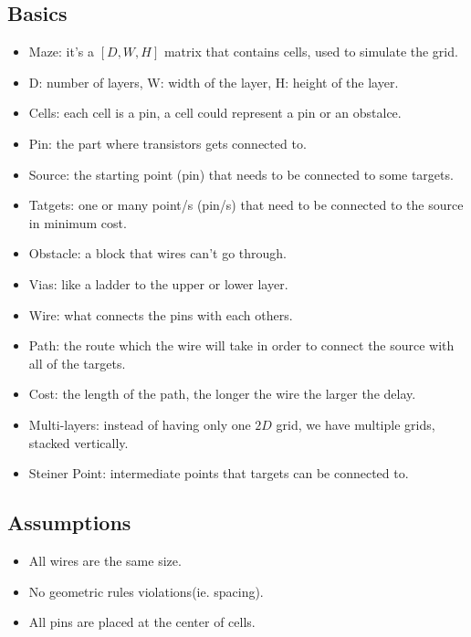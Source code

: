 \subsection{Basics} %
\begin{itemize}
	\item Maze: it's a $[D,W,H]$ matrix that contains cells, used to simulate the grid.
    \item D: number of layers, W: width of the layer, H: height of the layer.
    \item Cells: each cell is a pin, a cell could represent a pin or an obstalce.
	\item Pin: the part where transistors gets connected to.
	\item Source: the starting point (pin) that needs to be connected to some targets.
	\item Tatgets: one or many point/s (pin/s) that need to be connected to the source in minimum cost.
	\item Obstacle: a block that wires can't go through.
	\item Vias: like a ladder to the upper or lower layer.
	\item Wire: what connects the pins with each others.
	\item Path: the route which the wire will take in order to connect the source with all of the targets.
	\item Cost: the length of the path, the longer the wire the larger the delay.
	\item Multi-layers: instead of having only one $2D$ grid, we have multiple grids, stacked vertically.
	\item Steiner Point: intermediate points that targets can be connected to.
\end{itemize}

\subsection{Assumptions} 
\begin{itemize}
    \item All wires are the same size.
    \item No geometric rules violations(ie. spacing).
    \item All pins are placed at the center of cells.
\end{itemize}
